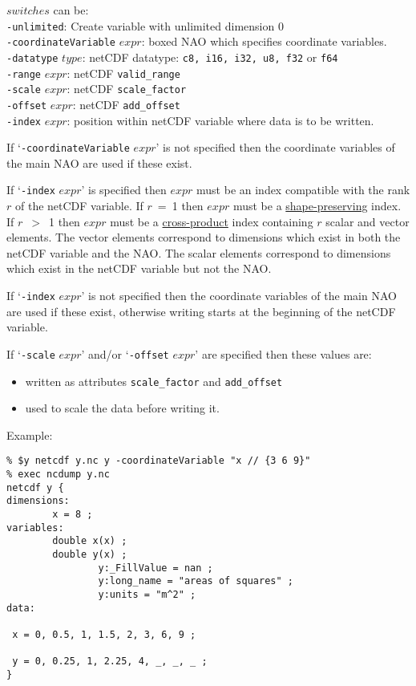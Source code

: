   $switches$ can be:
  \\
  \texttt{-unlimited}: Create variable with unlimited dimension 0
  \\
  \texttt{-coordinateVariable} 
  $expr$: boxed NAO which specifies coordinate variables.
  \\
  \texttt{-datatype} 
  $type$: netCDF datatype: 
  \texttt{c8, i16, i32, u8, f32} or 
  \texttt{f64}
  \\
  \texttt{-range} 
  $expr$: netCDF 
  \texttt{valid\_range}
  \\
  \texttt{-scale} 
  $expr$: netCDF 
  \texttt{scale\_factor}
  \\
  \texttt{-offset} 
  $expr$: netCDF 
  \texttt{add\_offset}
  \\
  \texttt{-index} 
  $expr$: position within netCDF variable where data is to be
  written.
  

If `\texttt{-coordinateVariable} 
  $expr$' is not specified then the coordinate variables
  of the main NAO are used if these exist.
  

If `\texttt{-index} 
  $expr$' is specified then 
  $expr$ must be an index compatible with the rank 
  $r$ of the netCDF variable. If 
  $r$\ =\ 1 then 
  $expr$ must be a 
  \href{indexing.html\#Shape-Preserving}{shape-preserving} index.
  If 
  $r$\ $>$\ 1 then 
  $expr$ must be a 
  \href{indexing.html\#Cross-product-index}{cross-product} index
  containing 
  $r$ scalar and vector elements. The vector elements
  correspond to dimensions which exist in both the netCDF variable and
  the NAO. The scalar elements correspond to dimensions which exist in
  the netCDF variable but not the NAO.
  

If `\texttt{-index} 
  $expr$' is not specified then the coordinate variables
  of the main NAO are used if these exist, otherwise writing starts at
  the beginning of the netCDF variable.
  

If `\texttt{-scale} 
  $expr$' and/or `\texttt{-offset} 
  $expr$' are specified then these values are:
  \begin{itemize}
    \item written as attributes 
    \texttt{scale\_factor} and 
    \texttt{add\_offset}
    \item used to scale the data before writing it.
  \end{itemize}
  

Example:
  \begin{verbatim}
% $y netcdf y.nc y -coordinateVariable "x // {3 6 9}"
% exec ncdump y.nc
netcdf y {
dimensions:
        x = 8 ;
variables:
        double x(x) ;
        double y(x) ;
                y:_FillValue = nan ;
                y:long_name = "areas of squares" ;
                y:units = "m^2" ;
data:

 x = 0, 0.5, 1, 1.5, 2, 3, 6, 9 ;

 y = 0, 0.25, 1, 2.25, 4, _, _, _ ;
}
\end{verbatim}

